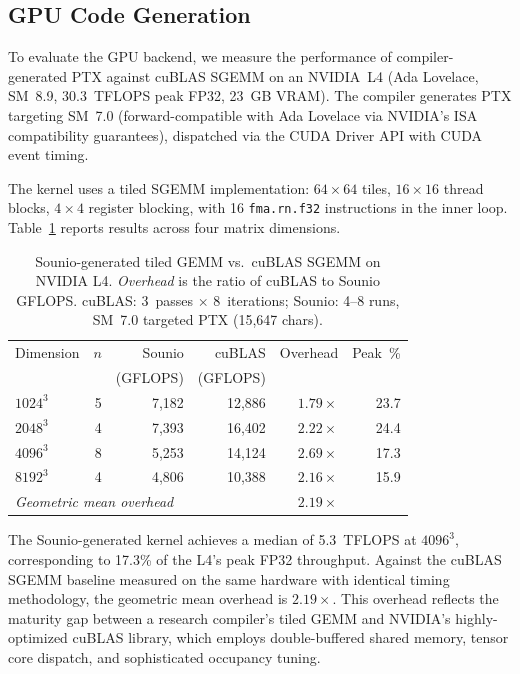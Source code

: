 
\subsection{GPU Code Generation}
\label{sec:gpu-perf}

To evaluate the \sounio GPU backend, we measure the performance of
compiler-generated PTX against cuBLAS SGEMM on an NVIDIA~L4 (Ada
Lovelace, SM~8.9, 30.3~TFLOPS peak FP32, 23~GB VRAM).  The \sounio
compiler generates PTX targeting SM~7.0 (forward-compatible with Ada
Lovelace via NVIDIA's ISA compatibility guarantees), dispatched via the
CUDA Driver API with CUDA event timing.

The kernel uses a tiled SGEMM implementation: $64\times64$ tiles,
$16\times16$ thread blocks, $4\times4$ register blocking, with 16
\texttt{fma.rn.f32} instructions in the inner loop.
Table~\ref{tab:gpu-perf} reports results across four matrix dimensions.

\begin{table}[t]
\centering
\caption{Sounio-generated tiled GEMM vs.\ cuBLAS SGEMM on NVIDIA L4.
  \emph{Overhead} is the ratio of cuBLAS to Sounio GFLOPS.
  cuBLAS: 3~passes $\times$ 8~iterations;
  Sounio: 4--8 runs, SM~7.0 targeted PTX (15{,}647 chars).}
\label{tab:gpu-perf}
\begin{tabular}{lrrrrr}
\toprule
Dimension & $n$ & Sounio & cuBLAS & Overhead & Peak~\% \\
          &     & (GFLOPS)  & (GFLOPS) & & \\
\midrule
$1024^3$ & 5 & 7{,}182 & 12{,}886 & $1.79\times$ & 23.7 \\
$2048^3$ & 4 & 7{,}393 & 16{,}402 & $2.22\times$ & 24.4 \\
$4096^3$ & 8 & 5{,}253 & 14{,}124 & $2.69\times$ & 17.3 \\
$8192^3$ & 4 & 4{,}806 & 10{,}388 & $2.16\times$ & 15.9 \\
\midrule
\multicolumn{4}{l}{\emph{Geometric mean overhead}} & $2.19\times$ & \\
\bottomrule
\end{tabular}
\end{table}

The Sounio-generated kernel achieves a median of 5.3~TFLOPS at
$4096^3$, corresponding to 17.3\% of the L4's peak FP32 throughput.
Against the cuBLAS SGEMM baseline measured on the same hardware with
identical timing methodology, the geometric mean overhead is
$2.19\times$.  This overhead reflects the maturity gap between a
research compiler's tiled GEMM and NVIDIA's highly-optimized cuBLAS
library, which employs double-buffered shared memory, tensor core
dispatch, and sophisticated occupancy tuning.

